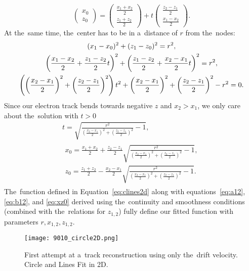 				\begin{equation}
					\begin{pmatrix} x_0\\ z_0 \end{pmatrix} = \begin{pmatrix} \frac{x_1+x_2}{2}\\ \frac{z_1+z_2}{2} \end{pmatrix} + t \begin{pmatrix} \frac{z_2-z_1}{2}\\ \frac{x_1-x_2}{2} \end{pmatrix}.
				\end{equation}
			At the~same time, the~center has to be in a~distance of $r$ from the~nodes:
				\begin{gather}
					(x_1-x_0)^2 + (z_1-z_0)^2 = r^2,\notag\\
					\left(\frac{x_1-x_2}{2}+\frac{z_1-z_2}{2}t\right)^2 + \left(\frac{z_1-z_2}{2}+\frac{x_2-x_1}{2}t\right)^2 = r^2,\notag\\
					\left(\left(\frac{x_2-x_1}{2}\right)^2+\left(\frac{z_2-z_1}{2}\right)^2\right)t^2+\left(\frac{x_2-x_1}{2}\right)^2+\left(\frac{z_2-z_1}{2}\right)^2-r^2=0.
				\end{gather}
			Since our electron track bends towards negative $z$ and $x_2 > x_1$, we only care about the~solution with $t>0$
				\begin{gather}
					t = \sqrt{\frac{r^2}{\left(\frac{x_2-x_1}{2}\right)^2+\left(\frac{z_2-z_1}{2}\right)^2}-1},\\
					\begin{aligned}
						x_0 = \frac{x_1+x_2}{2} + \frac{z_2-z_1}{2} \sqrt{\frac{r^2}{\left(\frac{x_2-x_1}{2}\right)^2+\left(\frac{z_2-z_1}{2}\right)^2}-1},\label{eq:xz0}\\
						z_0 = \frac{z_1+z_2}{2} - \frac{x_2-x_1}{2} \sqrt{\frac{r^2}{\left(\frac{x_2-x_1}{2}\right)^2+\left(\frac{z_2-z_1}{2}\right)^2}-1}.
					\end{aligned}
				\end{gather}
			The~function defined in Equation~\ref{eq:clines2d} along with equations~\ref{eq:a12}, \ref{eq:b12}, and \ref{eq:xz0} derived using the~continuity and smoothness conditions (combined with the~relations for $z_{1,2}$) fully define our fitted function with parameters $r,x_{1,2},z_{1,2}$.
			
			\begin{figure}
				\centering
				\texttt{[image: 9010\_circle2D.png]}
				\caption{First attempt at a~track reconstruction using only the~drift velocity. Circle and Lines Fit in 2D.}
				\label{fig:9010circle2D}
			\end{figure}
		
